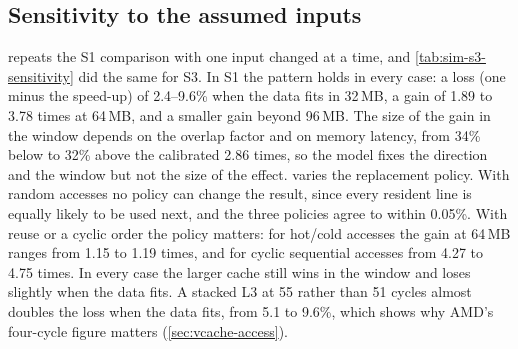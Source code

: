 \subsection{Sensitivity to the assumed inputs}
\label{sec:sim-sensitivity}
 repeats the S1 comparison with one input changed at a time, and \cref{tab:sim-s3-sensitivity} did the same for S3. In S1 the pattern holds in every case: a loss (one minus the speed-up) of 2.4--9.6\% when the data fits in 32\,MB, a gain of 1.89 to 3.78 times at 64\,MB, and a smaller gain beyond 96\,MB. The size of the gain in the window depends on the overlap factor and on memory latency, from 34\% below to 32\% above the calibrated 2.86 times, so the model fixes the direction and the window but not the size of the effect.  varies the replacement policy. With random accesses no policy can change the result, since every resident line is equally likely to be used next, and the three policies agree to within 0.05\%. With reuse or a cyclic order the policy matters: for hot/cold accesses the gain at 64\,MB ranges from 1.15 to 1.19 times, and for cyclic sequential accesses from 4.27 to 4.75 times. In every case the larger cache still wins in the window and loses slightly when the data fits. A stacked L3 at 55 rather than 51 cycles almost doubles the loss when the data fits, from 5.1 to 9.6\%, which shows why AMD's four-cycle figure matters (\cref{sec:vcache-access}).

